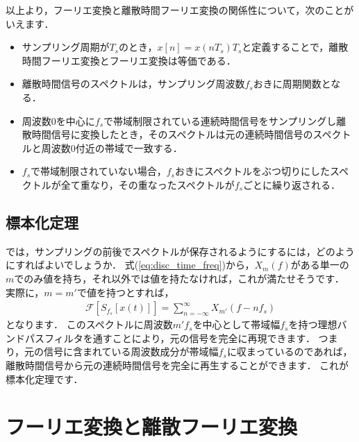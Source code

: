 以上より，フーリエ変換と離散時間フーリエ変換の関係性について，次のことがいえます．
\begin{itemize}
\item サンプリング周期が$T_s$のとき，$x[n]=x(nT_s)T_s$と定義することで，離散時間フーリエ変換とフーリエ変換は等価である．
\item 離散時間信号のスペクトルは，サンプリング周波数$f_s$おきに周期関数となる．
\item 周波数0を中心に$f_s$で帯域制限されている連続時間信号をサンプリングし離散時間信号に変換したとき，そのスペクトルは元の連続時間信号のスペクトルと周波数0付近の帯域で一致する．
\item $f_s$で帯域制限されていない場合，$f_s$おきにスペクトルをぶつ切りにしたスペクトルが全て重なり，その重なったスペクトルが$f_s$ごとに繰り返される．
\end{itemize}


\subsection{標本化定理}

では，サンプリングの前後でスペクトルが保存されるようにするには，どのようにすればよいでしょうか．
式(\ref{eq:disc_time_freq})から，$X_m(f)$がある単一の$m$でのみ値を持ち，それ以外では値を持たなければ，これが満たせそうです．
実際に，$m=m'$で値を持つとすれば，
\begin{align}
\mathcal{F}[S_{f_s}[x(t)]] = \sum_{n=-\infty}^{\infty} X_{m'}(f - nf_s)
\end{align}
となります．
このスペクトルに周波数$m'f_s$を中心として帯域幅$f_s$を持つ理想バンドパスフィルタを通すことにより，元の信号を完全に再現できます．
つまり，元の信号に含まれている周波数成分が帯域幅$f_s$に収まっているのであれば，
離散時間信号から元の連続時間信号を完全に再生することができます．
これが標本化定理です．


\section{フーリエ変換と離散フーリエ変換}

